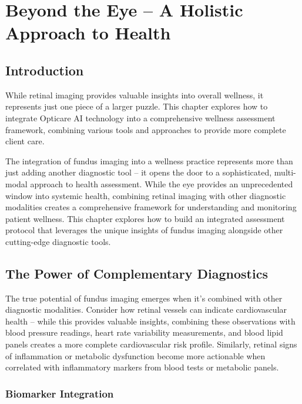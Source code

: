 \documentclass[
  Letterpaper,
]{scrbook}
\begin{document}

\chapter{Beyond the Eye -- A Holistic Approach to
Health}\label{beyond-the-eye-a-holistic-approach-to-health}

\section{Introduction}\label{introduction-2}

While retinal imaging provides valuable insights into overall wellness,
it represents just one piece of a larger puzzle. This chapter explores
how to integrate Opticare AI technology into a comprehensive wellness
assessment framework, combining various tools and approaches to provide
more complete client care.

The integration of fundus imaging into a wellness practice represents
more than just adding another diagnostic tool -- it opens the door to a
sophisticated, multi-modal approach to health assessment. While the eye
provides an unprecedented window into systemic health, combining retinal
imaging with other diagnostic modalities creates a comprehensive
framework for understanding and monitoring patient wellness. This
chapter explores how to build an integrated assessment protocol that
leverages the unique insights of fundus imaging alongside other
cutting-edge diagnostic tools.

\section{The Power of Complementary
Diagnostics}\label{the-power-of-complementary-diagnostics}

The true potential of fundus imaging emerges when it's combined with
other diagnostic modalities. Consider how retinal vessels can indicate
cardiovascular health -- while this provides valuable insights,
combining these observations with blood pressure readings, heart rate
variability measurements, and blood lipid panels creates a more complete
cardiovascular risk profile. Similarly, retinal signs of inflammation or
metabolic dysfunction become more actionable when correlated with
inflammatory markers from blood tests or metabolic panels.

\subsection{Biomarker Integration}\label{biomarker-integration}
\end{document}
